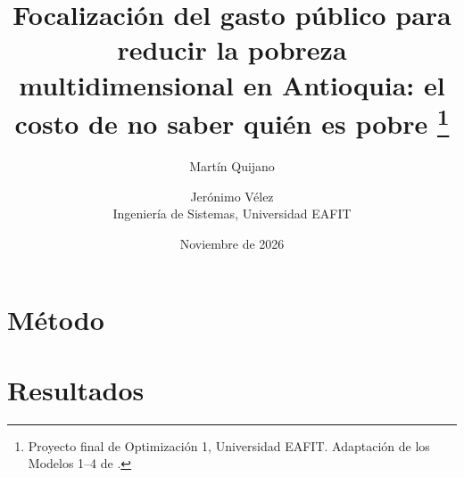 \documentclass[11pt,a4paper]{article}
\title{Focalización del gasto público para reducir la pobreza multidimensional
en Antioquia: el costo de no saber quién es pobre%
\thanks{Proyecto final de Optimización 1, Universidad EAFIT.
Adaptación de los Modelos 1--4 de \citet{hamie2024}.}}
\author{Martín Quijano \and Jerónimo Vélez\\[2pt]
\small Ingeniería de Sistemas, Universidad EAFIT}
\date{Noviembre de 2026}
\begin{document}
\maketitle





\section{Método}\label{sec:metodo}






\section{Resultados}\label{sec:resultados}









\appendix



\end{document}
